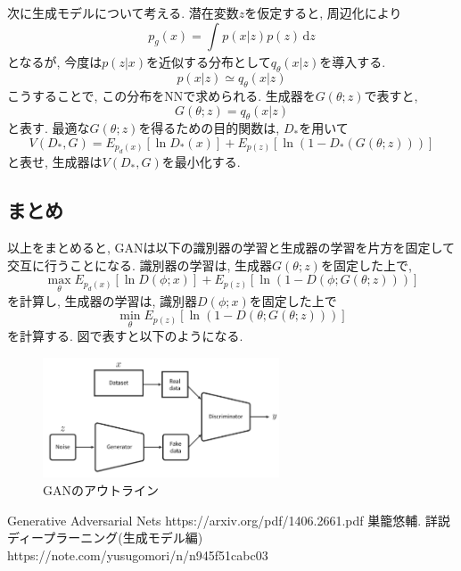 \documentclass[twocolumn]{jarticle}
\begin{document}
次に生成モデルについて考える. 潜在変数${z}$を仮定すると, 周辺化により
\begin{equation}
  p_g(x) = \int_{}^{} p(x|z)p(z)\,\mathrm{d}z
\end{equation}
となるが, 今度は${p(z|x)}$を近似する分布として${q_\theta(x|z)}$を導入する.
\begin{equation}
  p(x|z) \simeq q_\theta(x|z)
\end{equation}
こうすることで, この分布をNNで求められる. 生成器を${G(\theta;z)}$で表すと,
\begin{equation}
  G(\theta;z) = q_\theta(x|z)
\end{equation}
と表す. 最適な${G(\theta;z)}$を得るための目的関数は, ${D_\ast}$を用いて
\begin{equation}
  V(D_\ast, G) = E_{p_d(x)}[\ln D_\ast(x)] + E_{p(z)}[\ln(1 - D_\ast(G(\theta; z)))]
\end{equation}
と表せ, 生成器は${V(D_\ast, G)}$を最小化する.

\subsection{まとめ}
以上をまとめると, GANは以下の識別器の学習と生成器の学習を片方を固定して交互に行うことになる. 識別器の学習は, 生成器${G(\theta;z)}$を固定した上で,
\begin{equation}
  \max_\theta E_{p_d(x)}[\ln D(\phi; x)] + E_{p(z)}[\ln (1 - D(\phi; G(\theta; z)))]
\end{equation}
を計算し, 生成器の学習は, 識別器${D(\phi;x)}$を固定した上で
\begin{equation}
  \min_\theta E_{p(z)} [\ln (1 - D(\theta; G(\theta; z)))]
\end{equation}
を計算する.
図で表すと以下のようになる.

\begin{figure}[!htbp]
  \begin{center}
    \includegraphics[width=7cm]{./GAN_outline.png}
    \caption{GANのアウトライン}
    \label{fig:}
  \end{center}
 \end{figure}



\begin{thebibliography}{9}
   Generative Adversarial Nets https://arxiv.org/pdf/1406.2661.pdf
   巣籠悠輔. 詳説ディープラーニング(生成モデル編)　https://note.com/yusugomori/n/n945f51cabc03
\end{thebibliography}
\end{document}
